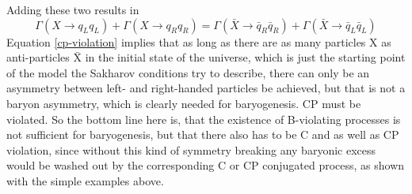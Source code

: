 Adding these two results in 
\begin{equation}
\Gamma(X\rightarrow q_Lq_L)+\Gamma(X\rightarrow q_Rq_R)=\Gamma(\bar{X}\rightarrow \bar{q}_R\bar{q}_R)+\Gamma(\bar{X}\rightarrow \bar{q}_L\bar{q}_L)
\label{cp-violation}
\end{equation}
Equation \ref{cp-violation} implies that as long as there are as many particles X as anti-particles $\bar{\text{X}}$ in the initial state of the universe, which is just the starting point of the model the Sakharov conditions try to describe, there can only be an asymmetry between left- and right-handed particles be achieved, but that is not a baryon asymmetry, which is clearly needed for baryogenesis. CP must be violated.\newline
So the bottom line here is, that the existence of B-violating processes is not sufficient for baryogenesis, but that there also has to be C and as well as CP violation, since without this kind of symmetry breaking any baryonic excess would be washed out by the corresponding C or CP conjugated process, as shown with the simple examples above. 
